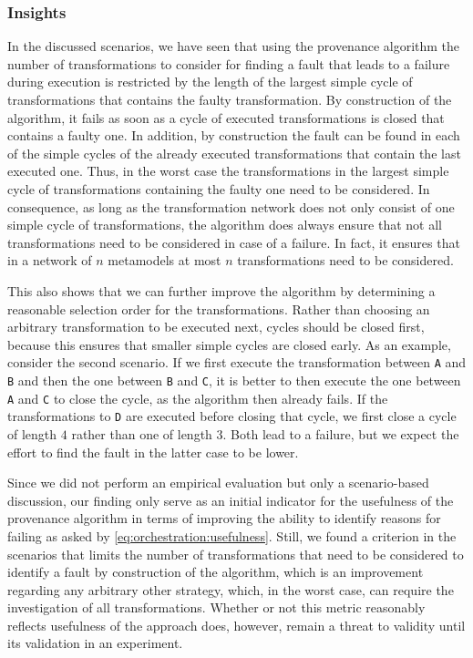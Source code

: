 \subsubsection{Insights}

In the discussed scenarios, we have seen that using the provenance algorithm the number of transformations to consider for finding a fault that leads to a failure during execution is restricted by the length of the largest simple cycle of transformations that contains the faulty transformation.
By construction of the algorithm, it fails as soon as a cycle of executed transformations is closed that contains a faulty one.
In addition, by construction the fault can be found in each of the simple cycles of the already executed transformations that contain the last executed one.
Thus, in the worst case the transformations in the largest simple cycle of transformations containing the faulty one need to be considered.
In consequence, as long as the transformation network does not only consist of one simple cycle of transformations, the algorithm does always ensure that not all transformations need to be considered in case of a failure.
In fact, it ensures that in a network of $n$ metamodels at most $n$ transformations need to be considered.

This also shows that we can further improve the algorithm by determining a reasonable selection order for the transformations.
Rather than choosing an arbitrary transformation to be executed next, cycles should be closed first, because this ensures that smaller simple cycles are closed early.
As an example, consider the second scenario.
If we first execute the transformation between \texttt{A} and \texttt{B} and then the one between \texttt{B} and \texttt{C}, it is better to then execute the one between \texttt{A} and \texttt{C} to close the cycle, as the algorithm then already fails.
If the transformations to \texttt{D} are executed before closing that cycle, we first close a cycle of length $4$ rather than one of length $3$. Both lead to a failure, but we expect the effort to find the fault in the latter case to be lower.

Since we did not perform an empirical evaluation but only a scenario-based discussion, our finding only serve as an initial indicator for the usefulness of the provenance algorithm in terms of improving the ability to identify reasons for failing as asked by \autoref{eq:orchestration:usefulness}.
Still, we found a criterion in the scenarios that limits the number of transformations that need to be considered to identify a fault by construction of the algorithm, which is an improvement regarding any arbitrary other strategy, which, in the worst case, can require the investigation of all transformations.
Whether or not this metric reasonably reflects usefulness of the approach does, however, remain a threat to validity until its validation in an experiment.

